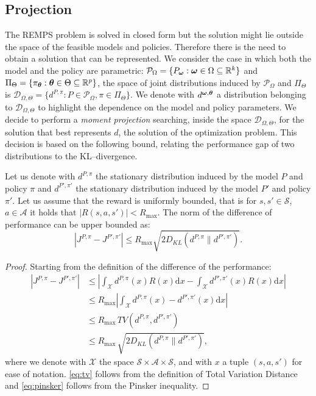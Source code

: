 \subsection{Projection}
The REMPS problem is solved in closed form but the solution might lie outside the space of the feasible models and policies. Therefore there is the need to obtain a solution that can be represented. \newline
We consider the case in which both the model and the policy are parametric: $\mathcal{P}_{\Omega} = \{ P_{\bm{\mathbf{\omega}}}: \bm{\mathbf{\omega}} \in \Omega \subseteq \mathbb{R}^k \}$ and $\Pi_{\Theta} = \{ \pi_{\bm{\mathbf{\theta}}}: \bm{\mathbf{\theta}} \in \Theta \subseteq \mathbb{R}^p \}$, the space of joint distributions induced by $\mathcal{P}_{\Omega}$ and $\Pi_{\Theta}$ is $\mathcal{D}_{\Omega , \Theta}=\{d^{P,\pi}: P \in \mathcal{P}_{\Omega}, \pi \in  \Pi_{\Theta}\}$. We denote with $d^{\bm{\mathbf{\omega}}, \bm{\mathbf{\theta}}}$ a distribution belonging to $\mathcal{D}_{\Omega , \Theta}$ to highlight the dependence on the model and policy parameters. \newline 
We decide to perform a \textit{moment projection} searching, inside the space $\mathcal{D}_{\Omega , \Theta}$, for the solution that best represents $d$, the solution of the optimization problem. \newline
This decision is based on the following bound, relating the performance gap of two distributions to the KL--divergence.
\begin{theorem}
Let us denote with $d^{P,\pi}$ the stationary distribution induced by the model $P$ and policy $\pi$ and $d^{P',\pi'}$ the stationary distribution induced by the model $P'$ and policy $\pi'$. Let us assume that the reward is uniformly bounded, that is for $s, s' \in \mathcal{S}$, $a \in \mathcal{A}$ it holds that $|R(s,a,s')| < R_{\max}$. The norm of the difference of performance can be upper bounded as:
\begin{equation}
	|J^{P,\pi} - J^{P',\pi'}| \leq R_{\max} \sqrt{2 D_{KL} (d^{P,\pi} \| d^{P',\pi'})}.
\end{equation}
\end{theorem}
\begin{proof}
	Starting from the definition of the difference of the performance:
\begin{align}
		|J^{P,\pi} - J^{P',\pi'}| &  \le  \left| \int_{\mathcal{X}} d^{P,\pi}(x) R(x) \mathrm{d}x - \int_{\mathcal{X}} d^{P',\pi'}(x) R(x) \mathrm{d}x \right| \\
& \le  R_{\max} \left| \int_{\mathcal{X}} d^{P,\pi}(x) - d^{P', \pi'}(x)\mathrm{d}x \right| \\
& \le R_{\max} \, TV(d^{P,\pi}, d^{P', \pi'}) \label{eq:tv} \\
& \le R_{\max} \, \sqrt{2D_{KL}(d^{P,\pi} \| d^{P', \pi'})}, \label{eq:pinsker}
	\end{align}
where we denote with $\mathcal{X}$ the space $\mathcal{S}\times \mathcal{A}\times  \mathcal{S}$, and with $x$ a tuple $(s,a,s')$ for ease of notation. \cref{eq:tv} follows from the definition of Total Variation Distance and \cref{eq:pinsker} follows from the Pinsker inequality.
\end{proof}

